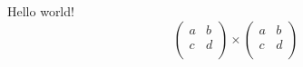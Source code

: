 \documentclass[11pt]{article}
\begin{document}
    Hello world!
    \[
    \begin{pmatrix}
      a & b \\
      c & d \\
    \end{pmatrix}
  \times
  \begin{pmatrix}
    a & b \\
    c & d\\
  \end{pmatrix}
  \]
\end{document}
